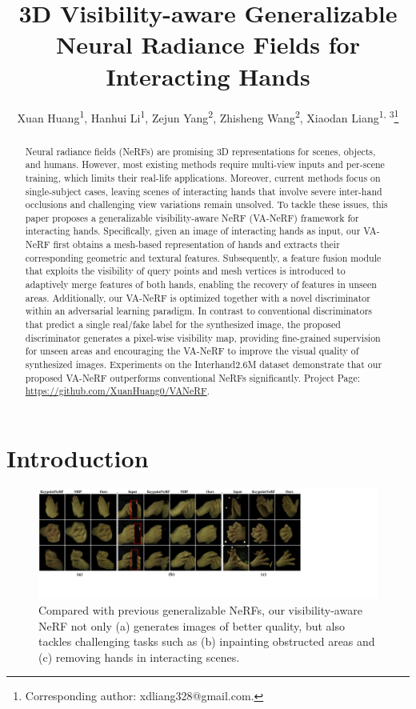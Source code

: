 \documentclass[letterpaper]{article}
\title{3D Visibility-aware Generalizable Neural Radiance Fields for Interacting Hands}
\author{
    Xuan Huang\textsuperscript{\rm 1}\equalcontrib, Hanhui Li\textsuperscript{\rm 1}\equalcontrib, Zejun Yang\textsuperscript{\rm 2}, Zhisheng Wang\textsuperscript{\rm 2}, Xiaodan Liang\textsuperscript{\rm 1, \rm 3}\thanks{Corresponding author: xdliang328@gmail.com.}
}
\begin{document}
\maketitle

\begin{abstract}
Neural radiance fields (NeRFs) are promising 3D representations for scenes, objects, and humans. However, most existing methods require multi-view inputs and per-scene training, which limits their real-life applications. Moreover, current methods focus on single-subject cases, leaving scenes of interacting hands that involve severe inter-hand occlusions and challenging view variations remain unsolved. To tackle these issues, this paper proposes a generalizable visibility-aware NeRF (VA-NeRF) framework for interacting hands. Specifically, given an image of interacting hands as input, our VA-NeRF first obtains a mesh-based representation of hands and extracts their corresponding geometric and textural features. Subsequently, a feature fusion module that exploits the visibility of query points and mesh vertices is introduced to adaptively merge features of both hands, enabling the recovery of features in unseen areas. Additionally, our VA-NeRF is optimized together with a novel discriminator within an adversarial learning paradigm. In contrast to conventional discriminators that predict a single real/fake label for the synthesized image, the proposed discriminator generates a pixel-wise visibility map, providing fine-grained supervision for unseen areas and encouraging the VA-NeRF to improve the visual quality of synthesized images. Experiments on the Interhand2.6M dataset demonstrate that our proposed VA-NeRF outperforms conventional NeRFs significantly. Project Page: \url{https://github.com/XuanHuang0/VANeRF}.
\end{abstract}

\section{Introduction}

\begin{figure}[t]
  \centering
  \includegraphics[width=1.0\hsize]{figures/banner.pdf}
  \caption{Compared with previous generalizable NeRFs, our visibility-aware NeRF not only (a) generates images of better quality, but also tackles challenging tasks such as (b) inpainting obstructed areas and (c) removing hands in interacting scenes.}
  \label{fig:banner}
\end{figure}
\end{document}
